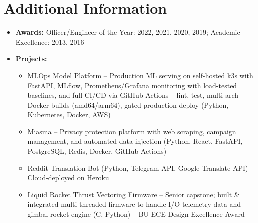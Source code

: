 \documentclass{article}
\begin{document}
\section{Additional Information} 
\begin{itemize}
    \itemsep0.2em
    \item \textbf{Awards: }Officer/Engineer of the Year: 2022, 2021, 2020, 2019; Academic Excellence: 2013, 2016
    \item \textbf{Projects: }
    \vspace{-\topsep} \vspace{0.2em}
    \begin{itemize}
        \itemsep0em
        \item MLOps Model Platform -- Production ML serving on self-hosted k3s with FastAPI, MLflow, Prometheus/Grafana monitoring with load-tested baselines, and full CI/CD via GitHub Actions -- lint, test, multi-arch Docker builds (amd64/arm64), gated production deploy (Python, Kubernetes, Docker, AWS)
        \item Miasma -- Privacy protection platform with web scraping, campaign management, and automated data injection (Python, React, FastAPI, PostgreSQL, Redis, Docker, GitHub Actions)
        \item Reddit Translation Bot (Python, Telegram API, Google Translate API) -- Cloud-deployed on Heroku
        \item Liquid Rocket Thrust Vectoring Firmware -- Senior capstone; built \& integrated multi-threaded firmware to handle I/O telemetry data and gimbal rocket engine (C, Python) -- BU ECE Design Excellence Award
    \end{itemize} \end{itemize} 

\end{document}
